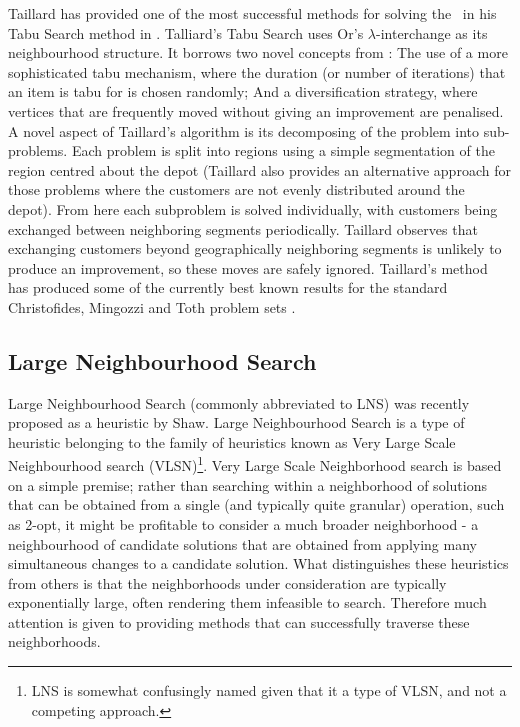 Taillard has provided one of the most successful methods for solving the \VRP\ in his Tabu Search method in \cite{Taillard:1993}. Talliard's Tabu Search uses Or's $\lambda$-interchange as its neighbourhood structure. It borrows two novel concepts from \cite{GHL:1994}: The use of a more sophisticated tabu mechanism, where the duration (or number of iterations) that an item is tabu for is chosen randomly; And a diversification strategy, where vertices that are frequently moved without giving an improvement are penalised. A novel aspect of Taillard's algorithm is its decomposing of the problem into sub-problems. Each problem is split into regions using a simple segmentation of the region centred about the depot (Taillard also provides an alternative approach for those problems where the customers are not evenly distributed around the depot). From here each subproblem is solved individually, with customers being exchanged between neighboring segments periodically. Taillard observes that exchanging customers beyond geographically neighboring segments is unlikely to produce an improvement, so these moves are safely ignored. Taillard's method has produced some of the currently best known results for the standard Christofides, Mingozzi and Toth problem sets \cite{CMT:1981}. 

\subsection{Large Neighbourhood Search}

Large Neighbourhood Search (commonly abbreviated to LNS) was recently proposed as a heuristic by Shaw\cite{Shaw:1998}. Large Neighbourhood Search is a type of heuristic belonging to the family of heuristics known as Very Large Scale Neighbourhood search (VLSN)\footnote{LNS is somewhat confusingly named given that it a type of VLSN, and not a competing approach.}. Very Large Scale Neighborhood search is based on a simple premise; rather than searching within a neighborhood of solutions that can be obtained from a single (and typically quite granular) operation, such as 2-opt, it might be profitable to consider a much broader neighborhood - a neighbourhood of candidate solutions that are obtained from applying many simultaneous changes to a candidate solution. What distinguishes these heuristics from others is that the neighborhoods under consideration are typically exponentially large, often rendering them infeasible to search. Therefore much attention is given to providing methods that can successfully traverse these neighborhoods. 

